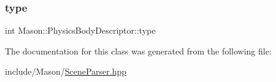 \hypertarget{class_mason_1_1_physics_body_descriptor_a30086565a0e9d3ec8c27366d852f333f}{}\label{class_mason_1_1_physics_body_descriptor_a30086565a0e9d3ec8c27366d852f333f} 
\subsubsection{\texorpdfstring{type}{type}}
{\footnotesize\ttfamily int Mason\+::\+Physics\+Body\+Descriptor\+::type}



The documentation for this class was generated from the following file\+:\begin{DoxyCompactItemize}
\item 
include/\+Mason/\hyperlink{_scene_parser_8hpp}{Scene\+Parser.\+hpp}\end{DoxyCompactItemize}
